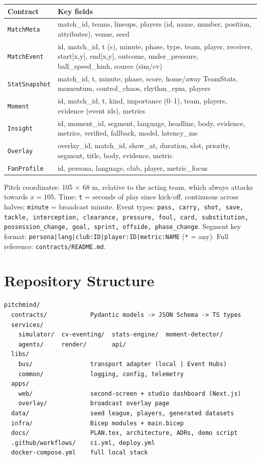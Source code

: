 \documentclass[11pt,a4paper]{article}
\begin{document}
\begin{tabularx}{\linewidth}{@{}l Y@{}}
\toprule
Contract & Key fields \\
\midrule
\texttt{MatchMeta}  & match\_id, teams, lineups, players (id, name, number, position, attributes), venue, seed \\
\texttt{MatchEvent} & id, match\_id, t (s), minute, phase, type, team, player, receiver, start[x,y], end[x,y], outcome, under\_pressure, ball\_speed\_kmh, source (sim/cv) \\
\texttt{StatSnapshot} & match\_id, t, minute, phase, score, home/away TeamStats, momentum, control\_chaos, rhythm\_epm, players \\
\texttt{Moment}     & id, match\_id, t, kind, importance (0--1), team, players, evidence (event ids), metrics \\
\texttt{Insight}    & id, moment\_id, segment, language, headline, body, evidence, metrics, verified, fallback, model, latency\_ms \\
\texttt{Overlay}    & overlay\_id, match\_id, show\_at, duration, slot, priority, segment, title, body, evidence, metric \\
\texttt{FanProfile} & id, persona, language, club, player, metric\_focus \\
\bottomrule
\end{tabularx}

\medskip
\noindent Pitch coordinates: 105 $\times$ 68 m, relative to the acting team, which always attacks towards $x = 105$.
Time: \texttt{t} = seconds of play since kick-off, continuous across halves; \texttt{minute} = broadcast minute.
Event types: \texttt{pass, carry, shot, save, tackle, interception, clearance, pressure, foul, card, substitution, possession\_change, goal, sprint, offside, phase\_change}.
Segment key format: \texttt{persona|lang|club:ID|player:ID|metric:NAME} (\texttt{*} = any).
Full reference: \texttt{contracts/README.md}.

\section{Repository Structure}
\begin{verbatim}
pitchmind/
  contracts/            Pydantic models -> JSON Schema -> TS types
  services/
    simulator/  cv-eventing/  stats-engine/  moment-detector/
    agents/     render/       api/
  libs/
    bus/                transport adapter (local | Event Hubs)
    common/             logging, config, telemetry
  apps/
    web/                second-screen + studio dashboard (Next.js)
    overlay/            broadcast overlay page
  data/                 seed league, players, generated datasets
  infra/                Bicep modules + main.bicep
  docs/                 PLAN.tex, architecture, ADRs, demo script
  .github/workflows/    ci.yml, deploy.yml
  docker-compose.yml    full local stack
\end{verbatim}
\end{document}
